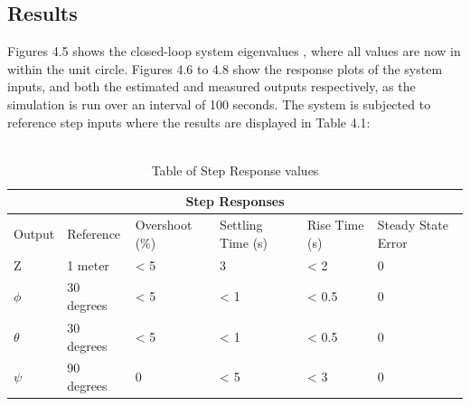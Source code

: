\documentclass[12pt,a4paper,twoside]{report}
\begin{document}
			\subsection{Results}
				
				Figures 4.5 shows the closed-loop system eigenvalues , where all values are now in within the unit circle. Figures 4.6 to 4.8 show the response plots of the system inputs, and both the estimated and measured outputs respectively, as the simulation is run over an interval of 100 seconds. The system is subjected to reference step inputs where the results are displayed in Table 4.1:
				\\ \\
				
				\begin{table}[h!]
					\centering
					\begin{tabular}{ |p{1.5cm}|p{3cm}|p{2cm}|p{2cm}|p{2cm}|p{2cm}|  }
						\hline
						\multicolumn{6}{|c|}{Step Responses} \\
						\hline
						Output   &  Reference  & Overshoot (\%) & Settling Time (s) & Rise Time (s) & Steady State Error \\
						\hline
						Z        &  1 meter         & < 5 &  3   & < 2   & 0\\
						$\phi$   &  30 degrees      & < 5 & < 1  & < 0.5 & 0\\
						$\theta$ &  30 degrees      & < 5 & < 1  & < 0.5 & 0\\
						$\psi$   & 	90 degrees      & 0   & < 5  & < 3   & 0\\
						\hline
					\end{tabular}
					\caption{Table of Step Response values}
					\label{table:stepresponses}
				\end{table}
			
\end{document}
